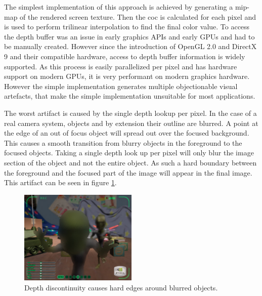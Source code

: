 The simplest implementation of this approach is achieved by generating a mip-map of the rendered screen texture.
Then the \gls{coc} is calculated for each pixel and is used to perform trilinear interpolation to find the final color value.
To access the depth buffer was an issue in early graphics APIs and early GPUs and had to be manually created.
However since the introduction of OpenGL 2.0 and DirectX 9 and their compatible hardware, access to depth buffer information is widely supported.
As this process is easily parallelized per pixel and has hardware support on modern GPUs, it is very performant on modern graphics hardware.
However the simple implementation generates multiple objectionable visual artefacts, that make the simple implementation unsuitable for most applications.\cite{Demers.2005, Hammon.2008}

The worst artifact is caused by the single depth lookup per pixel.
In the case of a real camera system, objects and by extension their outline are blurred.
A point at the edge of an out of focus object will spread out over the focused background.
This causes a smooth transition from blurry objects in the foreground to the focused objects.
Taking a single depth look up per pixel will only blur the image section of the object and not the entire object.
As such a hard boundary between the foreground and the focused part of the image will appear in the final image.
This artifact can be seen in figure \ref{fig:depth-discontinuity}.\cite{Demers.2005}


\begin{figure}[h]
    \centering
    \includegraphics[width=0.5\textwidth]{images/depth-discontinuity.jpg}
    \caption{Depth discontinuity causes hard edges around blurred objects. \cite{Demers.2005}}
    \label{fig:depth-discontinuity}
\end{figure}


